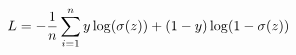\documentclass[preview]{standalone}
\begin{document}
\begin{align*}
\special{dvisvgm:raw <g id='unique000'>}L=-\frac{1}{n}\sum^n_{i=1}y\log(\sigma(z))+(1-y)\log(1-\sigma(z))\special{dvisvgm:raw </g>}
\end{align*}
\end{document}
